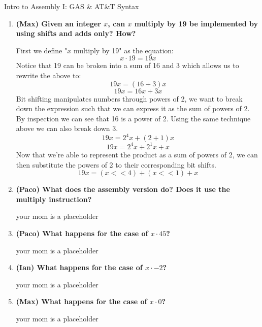 \documentclass{article}
\begin{document}
\centering
{\huge Intro to Assembly I: GAS \& AT\&T Syntax}
\vspace{0.5cm}

\begin{enumerate}
    \item \textbf{(Max) Given an integer \( x \), can \( x \) multiply by 19 be implemented by using shifts and adds only? How?}
    
    First we define "\( x \) multiply by 19" as the equation:
    \[
    x \cdot 19 = 19x
    \]
    Notice that 19 can be broken into a sum of 16 and 3 which allows us to rewrite the above to:
    \[
    19x = (16+3)x 
    \]
    \[
    19x = 16x + 3x
    \]
    Bit shifting manipulates numbers through powers of 2, we want to break down the expression such that we
    can express it as the sum of powers of 2. By inspection we can see that 16 is a power of 2. Using the same
    technique above we can also break down 3.
    \[
    19x = 2^4x + (2+1)x
    \]
    \[
    19x = 2^4x + 2^1x + x
    \]
    Now that we're able to represent the product as a sum of powers of 2, we can then substitute the powers of 2 to
    their corresponding bit shifts.
    \[
    19x = (x << 4) + (x << 1) + x
    \]

    \item \textbf{(Paco) What does the assembly version do? Does it use the multiply instruction?}
    
    your mom is a placeholder

    \item \textbf{(Paco) What happens for the case of \( x \cdot 45 \)?}
    
    your mom is a placeholder

    \item \textbf{(Ian) What happens for the case of \( x \cdot -2 \)?}
    
    your mom is a placeholder

    \item \textbf{(Max) What happens for the case of \( x \cdot  0 \)?}
    
    your mom is a placeholder
\end{enumerate}
\end{document}
